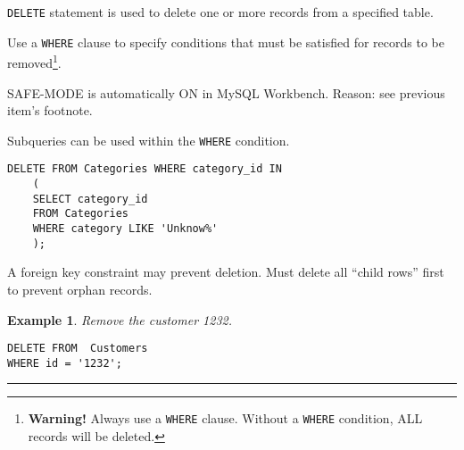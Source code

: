 \documentclass{article}
\newtheorem{example}{Example}
\begin{document}
 \begin{outline}[enumerate]
 
 	\1 \texttt{DELETE} statement is used to delete one or more records from a specified table.
	
	
	\1 Use a \texttt{WHERE} clause to specify conditions that must be satisfied for records to be removed\footnote{\textbf{Warning!} Always use a \texttt{WHERE} clause.  Without a \texttt{WHERE} condition, ALL records will be deleted.}.
	
	\1 	SAFE-MODE is automatically ON in MySQL Workbench.  Reason: see previous item's footnote.   

	
	\1 Subqueries can be used within the \texttt{WHERE} condition.
	\1[]  
	\begin{lstlisting}[frame=none]  
DELETE FROM Categories WHERE category_id IN
	(
	SELECT category_id 
	FROM Categories 
	WHERE category LIKE 'Unknow%'
	);
	\end{lstlisting} 
	
	\1 A foreign key constraint may prevent deletion.  Must delete all ``child rows'' first to prevent orphan records.
		


\end{outline}
 





\begin{example}
Remove the customer 1232.  
\end{example}




  
\begin{lstlisting}[frame=single]  
DELETE FROM  Customers
WHERE id = '1232';
\end{lstlisting} 





\hspace{-0.5cm}\rule[-0.101in]{\textwidth}{0.0025in}
  
  








 
\end{document}
